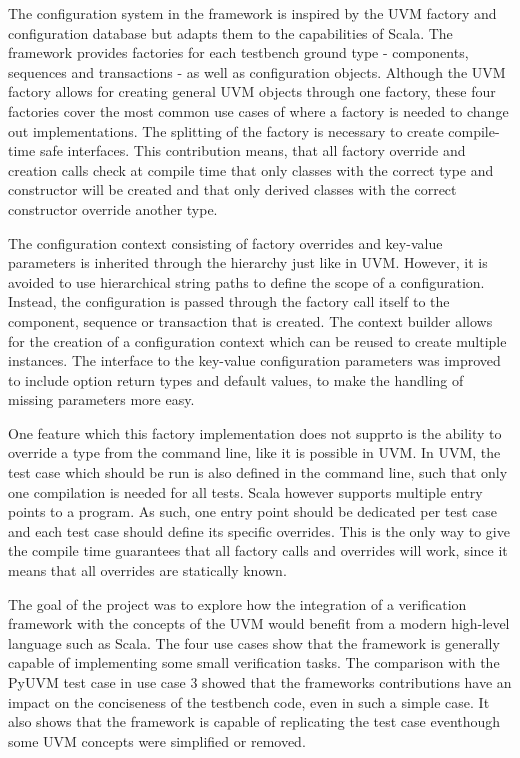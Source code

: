The configuration system in the framework is inspired by the UVM factory and configuration database but adapts them to the capabilities of Scala. The framework provides factories for each testbench ground type - components, sequences and transactions - as well as configuration objects. Although the UVM factory allows for creating general UVM objects through one factory, these four factories cover the most common use cases of where a factory is needed to change out implementations. The splitting of the factory is necessary to create compile-time safe interfaces. This contribution means, that all factory override and creation calls check at compile time that only classes with the correct type and constructor will be created and that only derived classes with the correct constructor override another type. 

The configuration context consisting of factory overrides and key-value parameters is inherited through the hierarchy just like in UVM. However, it is avoided to use hierarchical string paths to define the scope of a configuration. Instead, the configuration is passed through the factory call itself to the component, sequence or transaction that is created. The context builder allows for the creation of a configuration context which can be reused to create multiple instances. The interface to the key-value configuration parameters was improved to include option return types and default values, to make the handling of missing parameters more easy. 

One feature which this factory implementation does not supprto is the ability to override a type from the command line, like it is possible in UVM. In UVM, the test case which should be run is also defined in the command line, such that only one compilation is needed for all tests. Scala however supports multiple entry points to a program. As such, one entry point should be dedicated per test case and each test case should define its specific overrides. This is the only way to give the compile time guarantees that all factory calls and overrides will work, since it means that all overrides are statically known.



The goal of the project was to explore how the integration of a verification framework with the concepts of the UVM would benefit from a modern high-level language such as Scala. The four use cases show that the framework is generally capable of implementing some small verification tasks. The comparison with the PyUVM test case in use case 3 showed that the frameworks contributions have an impact on the conciseness of the testbench code, even in such a simple case. It also shows that the framework is capable of replicating the test case eventhough some UVM concepts were simplified or removed. 

